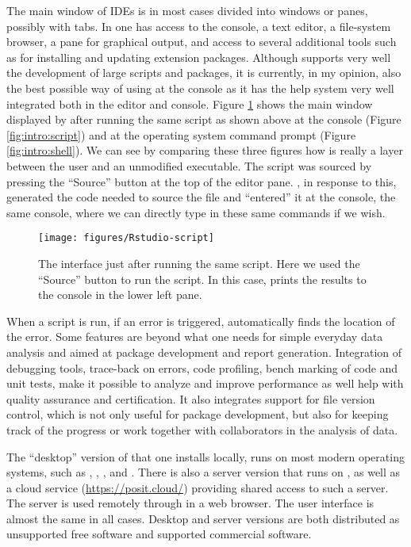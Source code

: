 \documentclass[krantz2]{krantz}\usepackage{knitr}
\begin{document}
The main window of IDEs is in most cases divided into windows or panes, possibly with tabs. In \RStudio one has access to the \Rpgrm console, a text editor, a file-system browser, a pane for graphical output, and access to several additional tools such as for installing and updating extension packages. Although \RStudio supports very well the development of large scripts and packages, it is currently, in my opinion, also the best possible way of using \Rpgrm at the console as it has the \Rpgrm help system very well integrated both in the editor and \Rlang console. Figure \ref{fig:intro:rstudio} shows the main window displayed by \RStudio after running the same script as shown above at the \Rpgrm console (Figure \ref{fig:intro:script}) and at the operating system command prompt (Figure \ref{fig:intro:shell}). We can see by comparing these three figures how \RStudio is really a layer between the user and an unmodified \Rpgrm executable. The script was sourced by pressing the ``Source'' button at the top of the editor pane. \RStudio, in response to this, generated the code needed to source the file and ``entered'' it at the console, the same console, where we can directly type in these same \Rpgrm commands if we wish.

\begin{figure}
  \centering
  \texttt{[image: figures/Rstudio-script]}
  \caption[Script in Rstudio]{The \RStudio interface just after running the same script. Here we used the ``Source'' button to run the script. In this case, \Rpgrm prints the results to the \Rpgrm console in the lower left pane.}\label{fig:intro:rstudio}
\end{figure}

\begin{explainbox}
When a script is run, if an error is triggered, \RStudio automatically finds the location of the error. Some features are beyond what one needs for simple everyday data analysis and aimed at package development and report generation. Integration of debugging tools, trace-back on errors, code profiling, bench marking of code and unit tests, make it possible to analyze and improve performance as well help with quality assurance and certification. It also integrates support for file version control, which is not only useful for package development, but also for keeping track of the progress or work together with collaborators in the analysis of data.
\end{explainbox}

The ``desktop'' version of \RStudio that one installs locally, runs on most modern operating systems, such as , , , and . There is also a server version that runs on , as well as a cloud service (\url{https://posit.cloud/}) providing shared access to such a server. The \RStudio server is used remotely through in a web browser. The user interface is almost the same in all cases. Desktop and server versions are both distributed as unsupported free software and supported commercial software.
\end{document}

